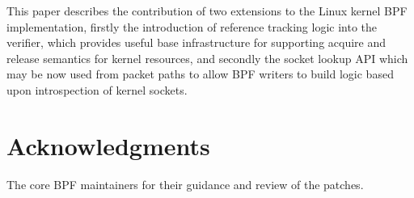 \documentclass[10pt,sigconf,authorversion]{lpc}
\begin{document}
This paper describes the contribution of two extensions to the Linux kernel BPF
implementation, firstly the introduction of reference tracking logic into the
verifier, which provides useful base infrastructure for supporting acquire and
release semantics for kernel resources, and secondly the socket lookup API
which may be now used from packet paths to allow BPF writers to build logic
based upon introspection of kernel sockets.

\section{Acknowledgments}

The core BPF maintainers for their guidance and review of the patches.



\end{document}
